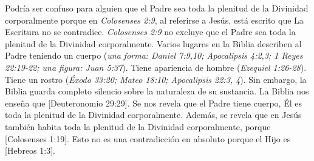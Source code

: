 Podría ser confuso para alguien que el Padre sea toda la plenitud de la Divinidad corporalmente porque en \textit{Colosenses 2:9}, al referirse a Jesús, está escrito que  La Escritura no se contradice. \textit{Colosenses 2:9} no excluye que el Padre sea toda la plenitud de la Divinidad corporalmente. Varios lugares en la Biblia describen al Padre teniendo un cuerpo (\textit{una forma: Daniel 7:9,10; Apocalipsis 4:2,3; 1 Reyes 22:19-22; una figura: Juan 5:37}). Tiene apariencia de hombre (\textit{Ezequiel 1:26-28}). Tiene un rostro (\textit{Éxodo 33:20; Mateo 18:10; Apocalipsis 22:3, 4}). Sin embargo, la Biblia guarda completo silencio sobre la naturaleza de su sustancia. La Biblia nos enseña que [Deuteronomio 29:29]. Se nos revela que el Padre tiene cuerpo, Él es toda la plenitud de la Divinidad corporalmente. Además, se revela que en Jesús también habita toda la plenitud de la Divinidad corporalmente, porque [Colosenses 1:19]. Esto no es una contradicción en absoluto porque el Hijo es [Hebreos 1:3].


